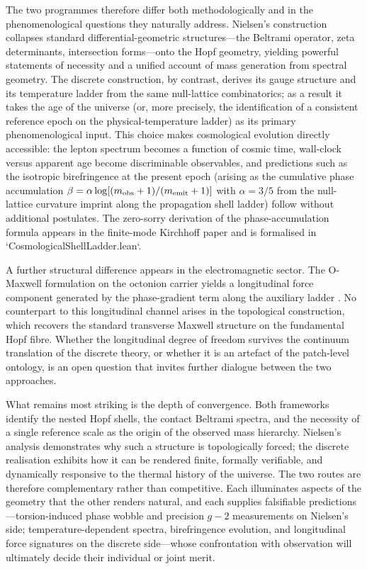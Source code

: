 \documentclass[11pt]{amsart}
\begin{document}
The two programmes therefore differ both methodologically and in the phenomenological questions they naturally address. Nielsen's construction collapses standard differential-geometric structures---the Beltrami operator, zeta determinants, intersection forms---onto the Hopf geometry, yielding powerful statements of necessity and a unified account of mass generation from spectral geometry. The discrete construction, by contrast, derives its gauge structure and its temperature ladder from the same null-lattice combinatorics; as a result it takes the age of the universe (or, more precisely, the identification of a consistent reference epoch on the physical-temperature ladder) as its primary phenomenological input. This choice makes cosmological evolution directly accessible: the lepton spectrum becomes a function of cosmic time, wall-clock versus apparent age become discriminable observables, and predictions such as the isotropic birefringence at the present epoch (arising as the cumulative phase accumulation \(\beta = \alpha \log[(m_{\rm obs}+1)/(m_{\rm emit}+1)]\) with \(\alpha=3/5\) from the null-lattice curvature imprint along the propagation shell ladder) follow without additional postulates. The zero-sorry derivation of the phase-accumulation formula appears in the finite-mode Kirchhoff paper and is formalised in `CosmologicalShellLadder.lean`.

A further structural difference appears in the electromagnetic sector. The O-Maxwell formulation on the octonion carrier yields a longitudinal force component generated by the phase-gradient term along the auxiliary ladder \cite{ettinger2026longitudinal}. No counterpart to this longitudinal channel arises in the topological construction, which recovers the standard transverse Maxwell structure on the fundamental Hopf fibre. Whether the longitudinal degree of freedom survives the continuum translation of the discrete theory, or whether it is an artefact of the patch-level ontology, is an open question that invites further dialogue between the two approaches.

What remains most striking is the depth of convergence. Both frameworks identify the nested Hopf shells, the contact Beltrami spectra, and the necessity of a single reference scale as the origin of the observed mass hierarchy. Nielsen's analysis demonstrates why such a structure is topologically forced; the discrete realisation exhibits how it can be rendered finite, formally verifiable, and dynamically responsive to the thermal history of the universe. The two routes are therefore complementary rather than competitive. Each illuminates aspects of the geometry that the other renders natural, and each supplies falsifiable predictions---torsion-induced phase wobble and precision $g-2$ measurements on Nielsen's side; temperature-dependent spectra, birefringence evolution, and longitudinal force signatures on the discrete side---whose confrontation with observation will ultimately decide their individual or joint merit.
\end{document}
